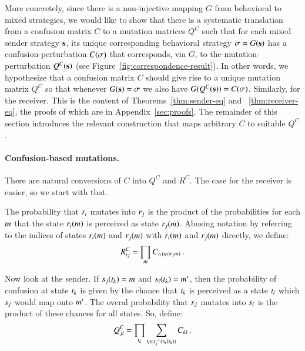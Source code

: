 More concretely, since there is a non-injective mapping $G$ from
behavioral to mixed strategies, we would like to show that there is a
systematic translation from a confusion matrix $C$ to a mutation
matrices $Q^C$ such that for each mixed sender strategy $\mathrm{\mathbf{s}}$, its
unique corresponding behavioral strategy $\sigma = G(\mathrm{\mathbf{s}})$ has a
confusion-perturbation $C(\sigma)$ that corresponds, via $G$, to the
mutation-perturbation $Q^C(\mathrm{\mathbf{s}})$ (see
Figure~\ref{fig:correspondence-result}). In other words, we
hypothesize that a confusion matrix $C$ should give rise to a unique
mutation matrix $Q^C$ so that whenever $G(\mathrm{\mathbf{s}}) = \sigma$ we also
have $G(Q^C(\mathrm{\mathbf{s}})) = C(\sigma)$. Similarly, for the receiver. This
is the content of Theorems~\ref{thm:sender-eq} and
~\ref{thm:receiver-eq}, the proofs of which are in
Appendix~\ref{sec:proofs}. The remainder of this section introduces
the relevant construction that maps arbitrary $C$ to suitable $Q^C$.

\paragraph{Confusion-based mutations.} There are natural conversions
of $C$ into $Q^C$ and $R^C$. The case for the receiver is easier, so
we start with that.

The probability that $r_i$ mutates into $r_j$ is the product of
the probabilities for each $m$ that the state $r_i(m)$ is
perceived as state $r_j(m)$. Abusing notation by referring to
the indices of states $r_i(m)$ and $r_j(m)$ with
$r_i(m)$ and $r_j(m)$ directly, we define:
\begin{align}
  \label{eq:construction-rec}
  R^C_{ij} = \prod_{m} C_{r_i(m)r_jm)}\,.
\end{align}

Now look at the sender. If $s_j(t_k)=m$ and
$s_i(t_k)=m'$, then the probability of confusion at
state $t_k$ is given by the chance that $t_k$ is perceived
as a state $t_l$ which $s_j$ would map onto $m'$. The
overal probability that $s_j$ mutates into $s_i$ is the
product of these chances for all states. So, define:
\begin{align}
  \label{eq:construction-rec}
  Q^C_{ji} = \prod_{t_k} \sum_{t_l \in
    s_j^{-1}(s_i(t_k))} C_{kl}\,.
\end{align}

